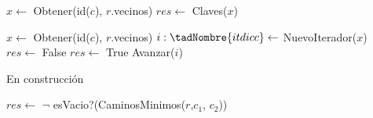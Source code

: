 \begin{Algoritmos}
\begin{algorithm}
\begin{algorithmic}[1]
  \State $x \gets$ Obtener(id($c$), $r$.vecinos)
  \State $res \gets$ Claves($x$)
 \EndProcedure
\end{algorithmic}


\begin{algorithmic}[1]
  \State $x \gets$ Obtener(id($c$), $r$.vecinos)
  \State $i :\tadNombre{itdicc} \gets$ NuevoIterador($x$)
  \State $res \gets$ False
     $res \gets$ True  \EndIf
    \State Avanzar($i$)
  \EndWhile
 \EndProcedure
\end{algorithmic}



\begin{algorithmic}[1]
   \State En construcción 
\EndProcedure
\end{algorithmic}


\begin{algorithmic}[1]
   \State $res \gets$ $\neg$ esVacio?(CaminosMinimos($r$,$c_1$, $c_2$))
\EndProcedure
\end{algorithmic}


\end{algorithm}



\end{Algoritmos}

